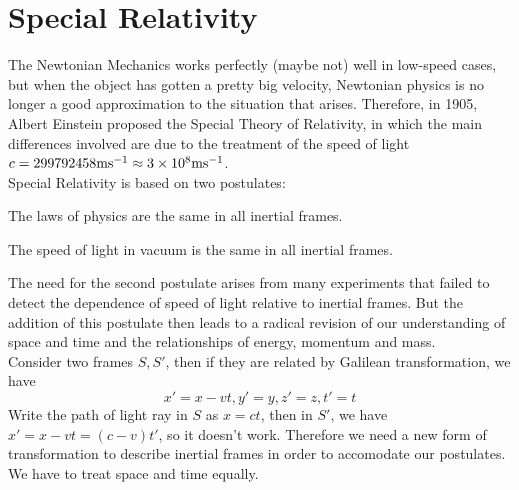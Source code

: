 \section{Special Relativity}
The Newtonian Mechanics works perfectly (maybe not) well in low-speed cases, but when the object has gotten a pretty big velocity, Newtonian physics is no longer a good approximation to the situation that arises.
Therefore, in 1905, Albert Einstein proposed the Special Theory of Relativity, in which the main differences involved are due to the treatment of the speed of light $c=299792458{\rm ms^{-1}}\approx 3\times 10^8{\rm ms^{-1}}$.\\
Special Relativity is based on two postulates:
\begin{postulate}
    The laws of physics are the same in all inertial frames.
\end{postulate}
\begin{postulate}
    The speed of light in vacuum is the same in all inertial frames.
\end{postulate}
The need for the second postulate arises from many experiments that failed to detect the dependence of speed of light relative to inertial frames.
But the addition of this postulate then leads to a radical revision of our understanding of space and time and the relationships of energy, momentum and mass.\\
Consider two frames $S,S'$, then if they are related by Galilean transformation, we have
$$x'=x-vt,y'=y,z'=z,t'=t$$
Write the path of light ray in $S$ as $x=ct$, then in $S'$, we have $x'=x-vt=(c-v)t'$, so it doesn't work.
Therefore we need a new form of transformation to describe inertial frames in order to accomodate our postulates.
We have to treat space and time equally.
